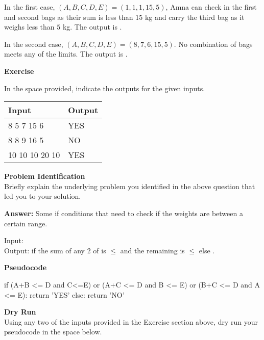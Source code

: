 \documentclass[a4paper]{exam}
\newcommand\heading[1]{\textbf{#1}}
\begin{document}
\begin{questions}
    In the first case, $(A,B,C,D,E)=(1,1,1,15,5)$, Amna can check in the first and second bags as their sum is less than $15$ kg and carry the third bag as it weighs less than $5$ kg. The output is .
    
    In the second case, $(A,B,C,D,E)=(8,7,6,15,5)$. No combination of bags meets any of the limits. The output is .

    \heading{Exercise}

    In the space provided, indicate the outputs for the given inputs.

    \begin{tabularx}{\textwidth}{|X|X|}
        \rowcolor{gray!50}
        \hline
        Input          & Output \\ \hline\hline
        8 5 7 15 6     & YES    \\\hline
        8 8 9 16 5     & NO     \\\hline
        10 10 10 20 10 & YES    \\\hline
    \end{tabularx}

    \heading{Problem Identification}\\
    Briefly explain the underlying problem you identified in the above question that led you to your solution.

    \heading{Answer:}
    Some if conditions that need to check if the weights are between a certain range.

    \begin{mdframed}
        Input:  \\
        Output:  if the sum of any 2 of  is $\le$  and the remaining is $\le$  else .
      \end{mdframed}

    \heading{Pseudocode}
\begin{python}
if (A+B <= D and C<=E) or (A+C <= D and B <= E) or (B+C <= D and A <= E):
    return 'YES'
else:
    return 'NO'
\end{python}
    

    \heading{Dry Run}\\
    Using any two of the inputs provided in the Exercise section above, dry run your pseudocode in the space below.
    \vspace*{100pt}



\end{questions}
\end{document}
